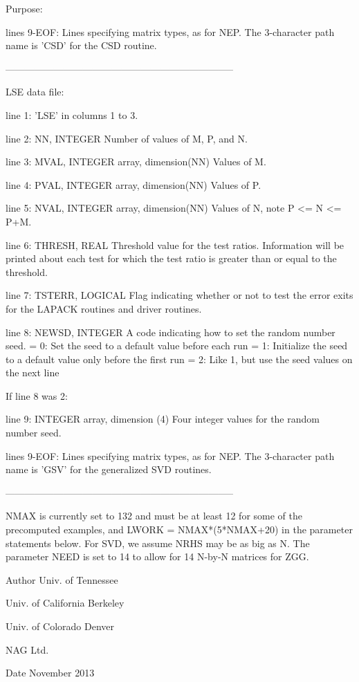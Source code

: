 \begin{DoxyParagraph}{Purpose\+: }
\begin{DoxyVerb}
 lines 9-EOF:  Lines specifying matrix types, as for NEP.
          The 3-character path name is 'CSD' for the CSD routine.

-----------------------------------------------------------------------

 LSE data file:

 line 1:  'LSE' in columns 1 to 3.

 line 2:  NN, INTEGER
          Number of values of M, P, and N.

 line 3:  MVAL, INTEGER array, dimension(NN)
          Values of M.

 line 4:  PVAL, INTEGER array, dimension(NN)
          Values of P.

 line 5:  NVAL, INTEGER array, dimension(NN)
          Values of N, note P <= N <= P+M.

 line 6:  THRESH, REAL
          Threshold value for the test ratios.  Information will be
          printed about each test for which the test ratio is greater
          than or equal to the threshold.

 line 7:  TSTERR, LOGICAL
          Flag indicating whether or not to test the error exits for
          the LAPACK routines and driver routines.

 line 8:  NEWSD, INTEGER
          A code indicating how to set the random number seed.
          = 0:  Set the seed to a default value before each run
          = 1:  Initialize the seed to a default value only before the
                first run
          = 2:  Like 1, but use the seed values on the next line

 If line 8 was 2:

 line 9:  INTEGER array, dimension (4)
          Four integer values for the random number seed.

 lines 9-EOF:  Lines specifying matrix types, as for NEP.
          The 3-character path name is 'GSV' for the generalized
          SVD routines.

-----------------------------------------------------------------------

 NMAX is currently set to 132 and must be at least 12 for some of the
 precomputed examples, and LWORK = NMAX*(5*NMAX+20) in the parameter
 statements below.  For SVD, we assume NRHS may be as big as N.  The
 parameter NEED is set to 14 to allow for 14 N-by-N matrices for ZGG.\end{DoxyVerb}
 
\end{DoxyParagraph}
\begin{DoxyAuthor}{Author}
Univ. of Tennessee 

Univ. of California Berkeley 

Univ. of Colorado Denver 

N\+A\+G Ltd. 
\end{DoxyAuthor}
\begin{DoxyDate}{Date}
November 2013 
\end{DoxyDate}
\hypertarget{group__complex16__eig_ga0b24cd17637a0c7c2689c338e3beb720}{}
